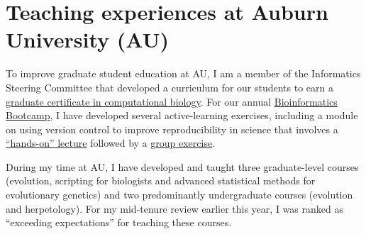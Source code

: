 
\section*{Teaching experiences at Auburn University (AU)}
To improve graduate student education at AU,
I am a member of the Informatics Steering Committee that developed a
curriculum for our students to earn a
\href{http://bulletin.auburn.edu/thegraduateschool/graduatedegreesoffered/biologicalsciencesmsphd_major/computationalbiology_gradcert/}{graduate certificate in computational biology}.
For our annual
\href{http://www.auburn.edu/cosam/bioinformatics/}{Bioinformatics Bootcamp},
I have developed several active-learning exercises,
including a module on using version control to improve reproducibility in
science that involves a
\href{http://phyletica.org/slides/git-intro/}{``hands-on'' lecture}
followed by a
\href{https://github.com/joaks1/au-bootcamp-git-intro}{group exercise}.

During my time at AU,
I have developed and taught three graduate-level courses
(evolution,
scripting for biologists and
advanced statistical methods for evolutionary genetics)
and two predominantly undergraduate courses
(evolution and
herpetology).
For my mid-tenure review earlier this year, I was ranked as ``exceeding
expectations'' for teaching these courses.

